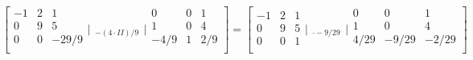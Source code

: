 $$
\left[
\begin{array}{rrr}
-1 & 2 & 1 \\
  0 & 9 &  5 \\
  0 & 0 & -29/9 \\
\end{array} \Bigg|
\begin{array}{ccc}
  _{} \\
  _{} \\
  _{-(4\cdot{II})/9} \\
\end{array}
\Bigg| \begin{array}{rrr}
  0 & 0 & 1 \\
  1 & 0 & 4 \\
  -4/9 & 1 & 2/9 \\
\end{array} \right] = \left[
\begin{array}{rrr}
-1 & 2 & 1 \\
  0 & 9 &  5 \\
  0 & 0 & 1 \\
\end{array} \Bigg|
\begin{array}{ccc}
  _{} \\
  _{} \\
  _{\cdot -9/29} \\
\end{array}
\Bigg| \begin{array}{rrr}
  0 & 0 & 1 \\
  1 & 0 & 4 \\
  4/29 & -9/29 & -2/29 \\
\end{array} \right]
$$

